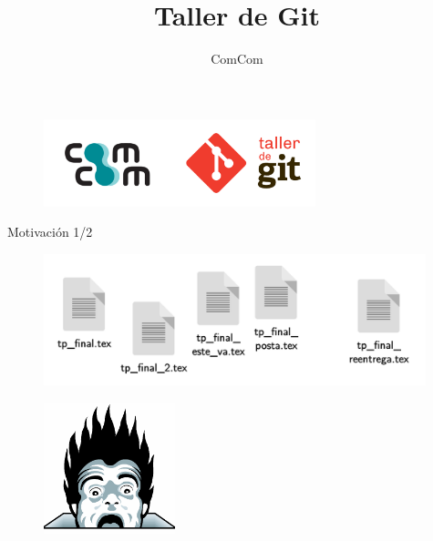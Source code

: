 \documentclass{beamer}
\title{Taller de Git}
\author{ComCom}
\institute{DC - FCEyN - UBA}
\begin{document}
\begin{frame}
  \titlepage
  \begin{figure}[ht]
      \begin{center}
          \includegraphics[height=1in]{images/logo-taller.png}
      \end{center}
  \end{figure}
\end{frame}


\begin{frame}{Motivación 1/2}

    \begin{figure}[ht]
        \begin{center}
            \includegraphics[height=1.5in]{images/caos.pdf}
        \end{center}
    \end{figure}

    \pause
    \begin{figure}[ht]
        \begin{center}
            \includegraphics[height=1.5in]{images/horror.png}
        \end{center}
    \end{figure}
\end{frame}
\end{document}
